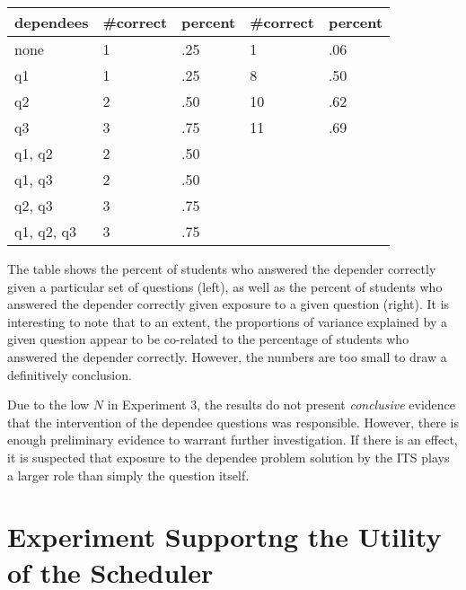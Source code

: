 \begin{center}
\begin{tabular}{|l|l|l|l|l|}
\hline
dependees    & \#correct &  percent & \#correct & percent \\ \hline
none         &  1  & .25  &1&  .06 \\ \hline
q1           &  1  & .25  &8&  .50 \\ \hline
q2           &  2  & .50  &10& .62 \\ \hline
q3           &  3  & .75  &11& .69 \\ \hline
q1, q2       &  2  & .50  && \\ \hline
q1, q3       &  2  & .50  && \\ \hline
q2, q3       &  3  & .75  && \\ \hline
q1, q2, q3   &  3  & .75  && \\ \hline
\end{tabular}
\end{center}

The table shows the percent of students who answered the depender correctly
given a particular set of questions (left), as well as the percent of students
who answered the depender correctly given exposure to a given question (right). 
It is interesting to note that to an extent, the proportions of variance
explained by a given question appear to be co-related to the percentage of
students who answered the depender correctly.  However, the numbers are too
small to draw a definitively conclusion.

Due to the low $N$ in Experiment 3, the results do not present
\emph{conclusive} evidence that the intervention of the dependee questions was
responsible.  However, there is enough preliminary evidence to warrant further
investigation.  If there is an effect, it is suspected that exposure to the
dependee problem solution by the ITS plays a larger role than simply the
question itself.



\section{Experiment Supportng the Utility of the Scheduler}
